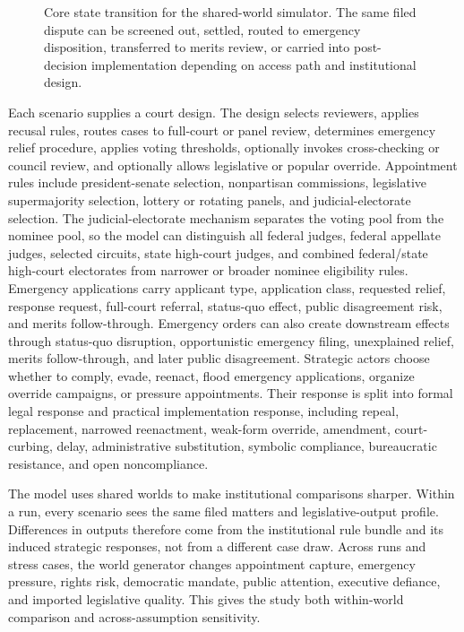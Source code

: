 \documentclass[
    journal=jlc,
    manuscript=research-article,
    year=2026,
  ]{cup-journal}
\providecommand{\Description}[1]{}
\begin{document}
\begin{figure}[hbt!]
\centering

\caption{Core state transition for the shared-world simulator. The same filed dispute can be screened out, settled, routed to emergency disposition, transferred to merits review, or carried into post-decision implementation depending on access path and institutional design.}
\Description{Flowchart showing filed universe, access path, admission screen, screen-out, settlement, emergency route, merits route, decision, post-decision response, and output diagnostics.}
\label{fig:model-flow}
\end{figure}

Each scenario supplies a court design. The design selects reviewers, applies recusal rules, routes cases to full-court or panel review, determines emergency relief procedure, applies voting thresholds, optionally invokes cross-checking or council review, and optionally allows legislative or popular override. Appointment rules include president-senate selection, nonpartisan commissions, legislative supermajority selection, lottery or rotating panels, and judicial-electorate selection. The judicial-electorate mechanism separates the voting pool from the nominee pool, so the model can distinguish all federal judges, federal appellate judges, selected circuits, state high-court judges, and combined federal/state high-court electorates from narrower or broader nominee eligibility rules. Emergency applications carry applicant type, application class, requested relief, response request, full-court referral, status-quo effect, public disagreement risk, and merits follow-through. Emergency orders can also create downstream effects through status-quo disruption, opportunistic emergency filing, unexplained relief, merits follow-through, and later public disagreement. Strategic actors choose whether to comply, evade, reenact, flood emergency applications, organize override campaigns, or pressure appointments. Their response is split into formal legal response and practical implementation response, including repeal, replacement, narrowed reenactment, weak-form override, amendment, court-curbing, delay, administrative substitution, symbolic compliance, bureaucratic resistance, and open noncompliance.

The model uses shared worlds to make institutional comparisons sharper. Within a run, every scenario sees the same filed matters and legislative-output profile. Differences in outputs therefore come from the institutional rule bundle and its induced strategic responses, not from a different case draw. Across runs and stress cases, the world generator changes appointment capture, emergency pressure, rights risk, democratic mandate, public attention, executive defiance, and imported legislative quality. This gives the study both within-world comparison and across-assumption sensitivity.
\end{document}
